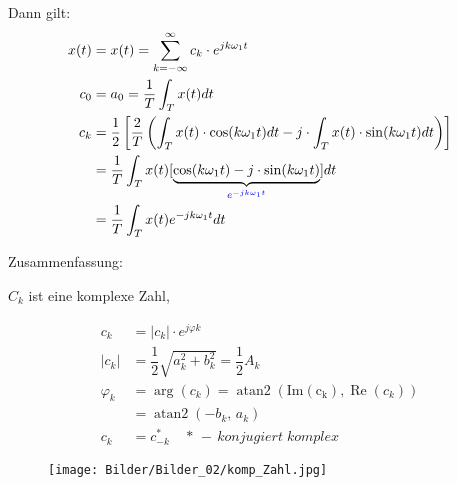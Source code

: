 Dann gilt:\\
\begin{equation}
    \begin{aligned}
        x(t)&=x(t)=\sum_{k=-\infty}^{\infty}c_k \cdot e^{jk \omega_1 t}\\
        c_{0} &=a_{0}=\frac{1}{T} \int_{T} x(t) d t \\
        c_{k} &=\frac{1}{2}\left[\frac{2}{T}\left(\int_{T} x(t) \cdot \cos (k \omega_{1} t) d t-j \cdot \int_{T} x(t) \cdot \sin (k \omega_{1} t) d t\right)\right] \\
        &=\frac{1}{T} \int_{T} x(t)[\underbrace{\cos (k \omega_{1} t)-j \cdot \sin( k \omega_{1} t)}_{\textcolor{blue}{e^{-j k \omega_{1} t}}}] d t \\
        &=\frac{1}{T} \int_{T} x(t) e^{-j k \omega_{1} t} d t
    \end{aligned}
    \nonumber
\end{equation}

Zusammenfassung:\\

$C_k$ ist eine komplexe Zahl,
\begin{figure}[H]
    \centering
    \begin{minipage}{.45\textwidth}
    \begin{center}
        \begin{equation}
            \begin{split}
                   c_{k}&=|c_k|\cdot e^{j\varphi k}\\
                   |c_k|&=\dfrac{1}{2} \sqrt{a_{k}^{2}+b_{k}^{2}}=\dfrac{1}{2} A_k\\
                   \varphi_k&=\operatorname{arg}(c_k)=\operatorname{atan2}(\operatorname{Im(c_k)},\operatorname{Re}(c_k))\\
                            &=\operatorname{atan2}(-b_k, \, a_k)\\
                    c_k&=c_{-k}^{*} \quad * \,-\, konjugiert \; komplex        
            \end{split}
            \nonumber
        \end{equation}
    \end{center}

    \end{minipage}
    \begin{minipage}{.45\textwidth}
        \centering
        \texttt{[image: Bilder/Bilder\_02/komp\_Zahl.jpg]}
        \nonumber
    \end{minipage}
\end{figure}

